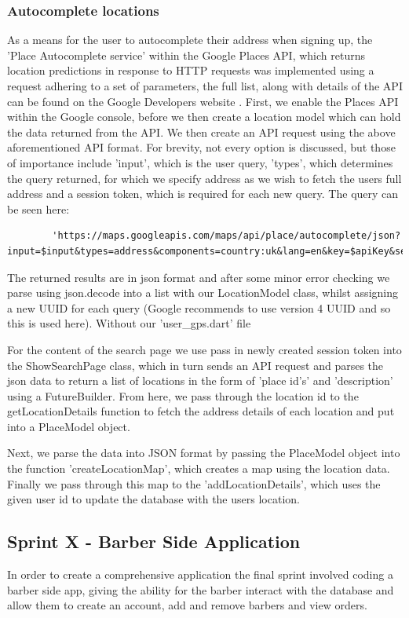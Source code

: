 \documentclass[12pt]{article}
\begin{document}
	\subsubsection{Autocomplete locations}
	As a means for the user to autocomplete their address when signing up, the 'Place Autocomplete service' within the Google Places API, which returns location predictions in response to HTTP requests was implemented using a request adhering to a set of parameters, the full list, along with details of the API can be found on the Google Developers website \cite{PlaceAutocompleteRequests}.
	First, we enable the Places API within the Google console, before we then create a location model which can hold the data returned from the API. We then create an API request using the above aforementioned API format. For brevity, not every option is discussed, but those of importance include 'input', which is the user query, 'types', which determines the query returned, for which we specify address as we wish to fetch the users full address and a session token, which is required for each new query. The query can be seen here:
	\begin{lstlisting}
		'https://maps.googleapis.com/maps/api/place/autocomplete/json?input=$input&types=address&components=country:uk&lang=en&key=$apiKey&sessiontoken=$sessionToken'
	\end{lstlisting}
	The returned results are in json format and after some minor error checking we parse using json.decode into a list with our LocationModel class, whilst assigning a new UUID for each query (Google recommends to use version 4 UUID and so this is used here). Without our 'user\_gps.dart' file
	
	For the content of the search page we use pass in newly created session token into the ShowSearchPage class, which in turn sends an API request and parses the json data to return a list of locations in the form of 'place id's' and 'description' using a FutureBuilder. From here, we pass through the location id to the getLocationDetails function to fetch the address details of each location and put into a PlaceModel object.
	
	Next, we parse the data into JSON format by passing the PlaceModel object into the function 'createLocationMap', which creates a map using the location data. Finally we pass through this map to the 'addLocationDetails', which uses the given user id to update the database with the users location.
	
	\subsection{Sprint X - Barber Side Application}
	In order to create a comprehensive application the final sprint involved coding a barber side app, giving the ability for the barber interact with the database and allow them to create an account, add and remove barbers and view orders.
	
\end{document}
